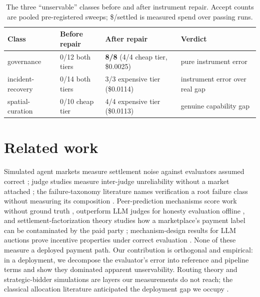 \documentclass{article}
\begin{document}
\begin{table}[t]
  \caption{The three ``unservable'' classes before and after instrument repair. Accept counts are pooled pre-registered sweeps; \$/settled is measured spend over passing runs.}
  \label{tab:scoreboard}
  \centering
  \small
  \begin{tabular}{llll}
    \toprule
    Class & Before repair & After repair & Verdict \\
    \midrule
    governance & 0/12 both tiers & \textbf{8/8} (4/4 cheap tier, \$0.0025) & pure instrument error \\
    incident-recovery & 0/14 both tiers & 3/3 expensive tier (\$0.0114) & instrument error over real gap \\
    spatial-curation & 0/10 cheap tier & 4/4 expensive tier (\$0.0113) & genuine capability gap \\
    \bottomrule
  \end{tabular}
\end{table}

\section{Related work}

Simulated agent markets measure settlement noise against evaluators assumed correct \citep{liu2026diagonprogrammabletestbedaiagent}; judge studies measure inter-judge unreliability without a market attached \citep{norman2026reliabilityvaliditysystematiclargescale}; the failure-taxonomy literature names verification a root failure class without measuring its composition \citep{cemri2025multiagentllmsystemsfail}. Peer-prediction mechanisms score work without ground truth \citep{srinivasan2025selfresolvingpredictionmarketsunverifiable, xu2025benchmarkingllmsjudgmentsgold}, outperform LLM judges for honesty evaluation offline \citep{qiu2026truthfulnessdespiteweaksupervision}, and settlement-factorization theory studies how a marketplace's payment label can be contaminated by the paid party \citep{dellapenna2026selfresolutionsettlementfactorizationrobust}; mechanism-design results for LLM auctions prove incentive properties under correct evaluation \citep{duetting2024mechanismdesignlargelanguage}. None of these measure a deployed payment path. Our contribution is orthogonal and empirical: in a deployment, we decompose the evaluator's error into reference and pipeline terms and show they dominated apparent unservability. Routing theory \citep{mahmood2026routingcascadesuserchoice} and strategic-bidder simulations \citep{chiu2026aiagentscompetejobs} are layers our measurements do not reach; the classical allocation literature anticipated the deployment gap we occupy \citep{Dias_2006, Gerkey_2004}.
\end{document}
